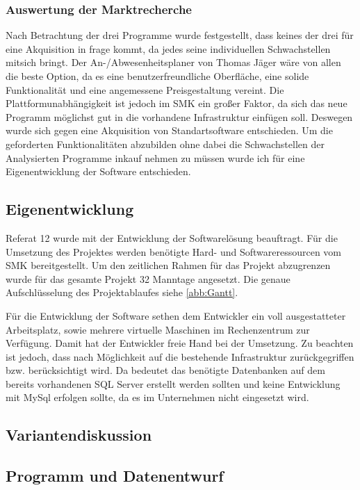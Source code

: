 \subsubsection{Auswertung der Marktrecherche}
\label{sec:AuswertungMarktrecherche}
Nach Betrachtung der drei Programme wurde festgestellt, dass keines der drei für eine Akquisition in frage kommt, da jedes seine individuellen Schwachstellen mitsich bringt. Der An-/Abwesenheitsplaner von Thomas Jäger wäre von allen die beste Option, da es eine benutzerfreundliche Oberfläche, eine solide Funktionalität und eine angemessene Preisgestaltung vereint. Die Plattformunabhängigkeit ist jedoch im SMK ein großer Faktor, da sich das neue Programm möglichst gut in die vorhandene Infrastruktur einfügen soll. Deswegen wurde sich gegen eine Akquisition von Standartsoftware entschieden. Um die geforderten Funktionalitäten abzubilden ohne dabei die Schwachstellen der Analysierten Programme inkauf nehmen zu müssen wurde ich für eine Eigenentwicklung der Software entschieden.

\subsection{Eigenentwicklung}
\label{sec:Eigenentwicklung}
Referat 12 wurde mit der Entwicklung der Softwarelösung beauftragt. Für die Umsetzung des Projektes werden benötigte Hard- und Softwareressourcen vom SMK bereitgestellt. Um den zeitlichen Rahmen für das Projekt abzugrenzen wurde für das gesamte Projekt 32 Manntage angesetzt. Die genaue Aufschlüsselung des Projektablaufes siehe \ref{abb:Gantt}.

Für die Entwicklung der Software sethen dem Entwickler ein voll ausgestatteter Arbeitsplatz, sowie mehrere virtuelle Maschinen im Rechenzentrum zur Verfügung. Damit hat der Entwickler freie Hand bei der Umsetzung. Zu beachten ist jedoch, dass nach Möglichkeit auf die bestehende Infrastruktur zurückgegriffen bzw. berücksichtigt wird. Da bedeutet das \zB benötigte Datenbanken auf dem bereits vorhandenen SQL Server erstellt werden sollten und keine Entwicklung mit MySql erfolgen sollte, da es im Unternehmen nicht eingesetzt wird.


\subsection{Variantendiskussion}
\label{sec:Marktrecherche}

\subsection{Programm und Datenentwurf}
\label{sec:ProgrammUDatenentwurf}